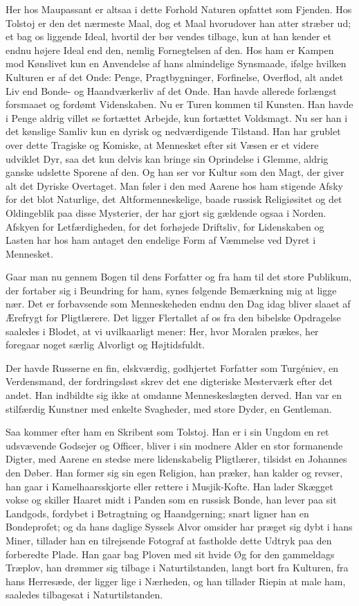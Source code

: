 \documentclass[12pt,a4paper]{article}
\begin{document}
Her hos Maupassant er altsaa i dette Forhold Naturen opfattet som Fjenden.
Hos Tolstoj er den det nærmeste Maal, dog et Maal hvorudover han atter
stræber ud; et bag os liggende Ideal, hvortil der bør vendes tilbage, kun
at han kender et endnu højere Ideal end den, nemlig Fornegtelsen af den.
Hos ham er Kampen mod Kønslivet kun en Anvendelse af hans almindelige
Synsmaade, ifølge hvilken Kulturen er af det Onde: Penge, Pragtbygninger,
Forfinelse, Overflod, alt andet Liv end Bonde- og Haandværkerliv af det
Onde. Han havde allerede forlængst forsmaaet og fordømt Videnskaben. Nu
er Turen kommen til Kunsten. Han havde i Penge aldrig villet se fortættet
Arbejde, kun fortættet Voldsmagt. Nu ser han i det kønslige Samliv kun en
dyrisk og nedværdigende Tilstand. Han har grublet over dette Tragiske og
Komiske, at Mennesket efter sit Væsen er et videre udviklet Dyr, saa det
kun delvis kan bringe sin Oprindelse i Glemme, aldrig ganske udslette
Sporene af den. Og han ser vor Kultur som den Magt, der giver alt det
Dyriske Overtaget. Man føler i den med Aarene hos ham stigende Afsky for
det blot Naturlige, det Altformenneskelige, baade russisk Religiøsitet og
det Oldingeblik paa disse Mysterier, der har gjort sig gældende ogsaa i
Norden. Afskyen for Letfærdigheden, for det forhøjede Driftsliv, for
Lidenskaben og Lasten har hos ham antaget den endelige Form af Væmmelse
ved Dyret i Mennesket.

Gaar man nu gennem Bogen til dens Forfatter og fra ham til det store
Publikum, der fortaber sig i Beundring for ham, synes følgende Bemærkning
mig at ligge nær. Det er forbavsende som Menneskeheden endnu den Dag
idag bliver slaaet af Ærefrygt for Pligtlærere. Det ligger Flertallet af
os fra den bibelske Opdragelse saaledes i Blodet, at vi uvilkaarligt
mener: Her, hvor Moralen prækes, her foregaar noget særlig Alvorligt og
Højtidsfuldt.

Der havde Russerne en fin, elskværdig, godhjertet Forfatter som
Turgéniev, en Verdensmand, der fordringsløst skrev det ene digteriske
Mesterværk efter det andet. Han indbildte sig ikke at omdanne
Menneskeslægten derved. Han var en stilfærdig Kunstner med enkelte
Svagheder, med store Dyder, en Gentleman.

Saa kommer efter ham en Skribent som Tolstoj. Han er i sin Ungdom en ret
udsvævende Godsejer og Officer, bliver i sin modnere Alder en stor
formanende Digter, med Aarene en stedse mere lidenskabelig Pligtlærer,
tilsidst en Johannes den Døber. Han former sig sin egen Religion, han
præker, han kalder og revser, han gaar i Kamelhaarsskjorte eller rettere
i Musjik-Kofte. Han lader Skægget vokse og skiller Haaret midt i Panden
som en russisk Bonde, han lever paa sit Landgods, fordybet i Betragtning
og Haandgerning; snart ligner han en Bondeprofet; og da hans daglige
Syssels Alvor omsider har præget sig dybt i hans Miner, tillader han en
tilrejsende Fotograf at fastholde dette Udtryk paa den forberedte Plade.
Han gaar bag Ploven med sit hvide Øg for den gammeldags Træplov, han
drømmer sig tilbage i Naturtilstanden, langt bort fra Kulturen, fra hans
Herresæde, der ligger lige i Nærheden, og han tillader Riepin at male
ham, saaledes tilbagesat i Naturtilstanden.
\end{document}
